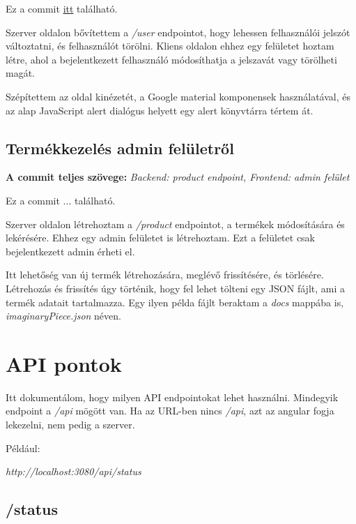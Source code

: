\documentclass[]{article}
\begin{document}
\bigskip
\noindent
Ez a commit \href{https://github.com/Gtomika/prf-project/commit/6794668ee38e4793fa249915b7df71481f39e519}{itt} található.
\bigskip

Szerver oldalon bővítettem a \textit{/user} endpointot, hogy lehessen felhasználói jelszót változtatni, és felhasználót törölni. Kliens oldalon ehhez egy felületet hoztam létre, ahol a bejelentkezett felhasználó módosíthatja a jelszavát vagy törölheti magát.

Szépítettem az oldal kinézetét, a Google material komponensek használatával, és az alap JavaScript alert dialógus helyett egy alert könyvtárra tértem át.

\subsection{Termékkezelés admin felületről}

\noindent
\textbf{A commit teljes szövege:} \textit{ Backend: product endpoint, Frontend: admin felület}

\bigskip
\noindent
Ez a commit ... található.
\bigskip

Szerver oldalon létrehoztam a \textit{/product} endpointot, a termékek módosítására és lekérésére. Ehhez egy admin felületet is létrehoztam. Ezt a felületet csak bejelentkezett admin érheti el. 

Itt lehetőség van új termék létrehozására, meglévő frissítésére, és törlésére. Létrehozás és frissítés úgy történik, hogy fel lehet tölteni egy JSON fájlt, ami a termék adatait tartalmazza. Egy ilyen példa fájlt beraktam a \textit{docs} mappába is, \textit{imaginaryPiece.json} néven.

\section{API pontok}

Itt dokumentálom, hogy milyen API endpointokat lehet használni. Mindegyik endpoint a \textit{/api} mögött van. Ha az URL-ben nincs \textit{/api}, azt az angular fogja lekezelni, nem pedig a szerver.

Például:

\bigskip
\begin{center}
	\textit{http://localhost:3080/api/status}
\end{center}

\subsection{/status}
\end{document}
